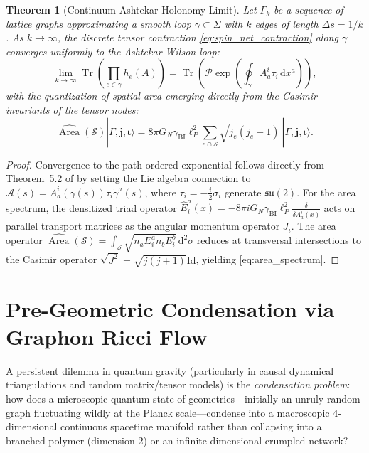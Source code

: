 \documentclass[11pt,a4paper,reqno]{amsart}
\newtheorem{theorem}{Theorem}[section]
\theoremstyle{definition}
\numberwithin{equation}{section}
\newcommand{\Id}{\mathrm{Id}}
\newcommand{\Tr}{\operatorname{Tr}}
\providecommand{\Area}{\operatorname{Area}}
\newcommand{\dif}{\,\mathrm{d}}
\begin{document}
\begin{theorem}[Continuum Ashtekar Holonomy Limit]
\label{thm:ashtekar_limit}
Let $\Gamma_k$ be a sequence of lattice graphs approximating a smooth loop $\gamma \subset \Sigma$ with $k$ edges of length $\Delta s = 1/k$. As $k \to \infty$, the discrete tensor contraction \eqref{eq:spin_net_contraction} along $\gamma$ converges uniformly to the Ashtekar Wilson loop:
\begin{equation}
    \lim_{k \to \infty} \Tr\left( \prod_{e \in \gamma} h_e(A) \right) = \Tr\left( \mathcal{P} \exp\left( \oint_\gamma A_a^i \tau_i \dif x^a \right) \right),
\end{equation}
with the quantization of spatial area emerging directly from the Casimir invariants of the tensor nodes:
\begin{equation}
    \label{eq:area_spectrum}
    \widehat{\Area}(\mathcal{S}) |\Gamma, \mathbf{j}, \mathbf{\iota}\rangle = 8\pi G_N \gamma_{\mathrm{BI}} \ell_P^2 \sum_{e \cap \mathcal{S}} \sqrt{j_e(j_e + 1)} \, |\Gamma, \mathbf{j}, \mathbf{\iota}\rangle.
\end{equation}
\end{theorem}
\begin{proof}
Convergence to the path-ordered exponential follows directly from Theorem~5.2 of \cite{silvafilho2026flows} by setting the Lie algebra connection to $\mathcal{A}(s) = A_a^i(\gamma(s)) \tau_i \dot{\gamma}^a(s)$, where $\tau_i = -\frac{i}{2} \sigma_i$ generate $\mathfrak{su}(2)$. For the area spectrum, the densitized triad operator $\widehat{E}_i^a(x) = -8\pi i G_N \gamma_{\mathrm{BI}} \ell_P^2 \frac{\delta}{\delta A_a^i(x)}$ acts on parallel transport matrices as the angular momentum operator $J_i$. The area operator $\widehat{\Area}(\mathcal{S}) = \int_{\mathcal{S}} \sqrt{n_a E_i^a n_b E_i^b} \dif^2 \sigma$ reduces at transversal intersections to the Casimir operator $\sqrt{J^2} = \sqrt{j(j+1)} \Id$, yielding \eqref{eq:area_spectrum}.
\end{proof}

\section{Pre-Geometric Condensation via Graphon Ricci Flow}
\label{sec:pre_geometry}

A persistent dilemma in quantum gravity (particularly in causal dynamical triangulations and random matrix/tensor models) is the \emph{condensation problem}: how does a microscopic quantum state of geometries—initially an unruly random graph fluctuating wildly at the Planck scale—condense into a macroscopic 4-dimensional continuous spacetime manifold rather than collapsing into a branched polymer (dimension 2) or an infinite-dimensional crumpled network?
\end{document}
